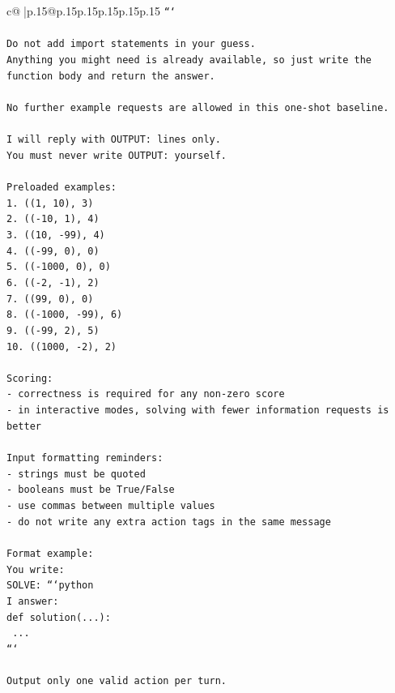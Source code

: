 \documentclass{article}
\begin{document}
{\begin{supertabular}{c@{$\;$}|p{.15\linewidth}@{}p{.15\linewidth}p{.15\linewidth}p{.15\linewidth}p{.15\linewidth}p{.15\linewidth}}
{{{\texttt{```} \\
\\ 
\texttt{Do not add import statements in your guess.} \\
\texttt{Anything you might need is already available, so just write the function body and return the answer.} \\
\\ 
\texttt{No further example requests are allowed in this one{-}shot baseline.} \\
\\ 
\texttt{I will reply with OUTPUT: lines only.} \\
\texttt{You must never write OUTPUT: yourself.} \\
\\ 
\texttt{Preloaded examples:} \\
\texttt{1. ((1, 10), 3)} \\
\texttt{2. (({-}10, 1), 4)} \\
\texttt{3. ((10, {-}99), 4)} \\
\texttt{4. (({-}99, 0), 0)} \\
\texttt{5. (({-}1000, 0), 0)} \\
\texttt{6. (({-}2, {-}1), 2)} \\
\texttt{7. ((99, 0), 0)} \\
\texttt{8. (({-}1000, {-}99), 6)} \\
\texttt{9. (({-}99, 2), 5)} \\
\texttt{10. ((1000, {-}2), 2)} \\
\\ 
\texttt{Scoring:} \\
\texttt{{-} correctness is required for any non{-}zero score} \\
\texttt{{-} in interactive modes, solving with fewer information requests is better} \\
\\ 
\texttt{Input formatting reminders:} \\
\texttt{{-} strings must be quoted} \\
\texttt{{-} booleans must be True/False} \\
\texttt{{-} use commas between multiple values} \\
\texttt{{-} do not write any extra action tags in the same message} \\
\\ 
\texttt{Format example:} \\
\texttt{You write:} \\
\texttt{SOLVE: ```python} \\
\texttt{I answer:} \\
\texttt{def solution(...):} \\
\texttt{    ...} \\
\texttt{```} \\
\\ 
\texttt{Output only one valid action per turn.} \\
            }
        }
    }
     \\ \\


\end{supertabular}}
\end{document}
